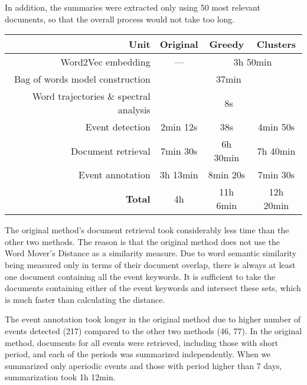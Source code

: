 In addition, the summaries were extracted only using 50 most relevant documents, so that the overall process would not take too long.

\hspace{\fill}

\begin{minipage}{\linewidth}
\centering
\begin{tabular}{ r c c c }\toprule[1.5pt]
\bf Unit & \bf Original & \bf Greedy & \bf Clusters \\ \midrule
Word2Vec embedding & --- & \multicolumn{2}{c}{3h 50min} \\
Bag of words model construction & \multicolumn{3}{c}{37min} \\
Word trajectories \& spectral analysis & \multicolumn{3}{c}{8s} \\
Event detection & 2min 12s & 38s & 4min 50s \\
Document retrieval & 7min 30s & 6h 30min & 7h 40min \\
Event annotation & 3h 13min & 8min 20s & 7min 30s \\ \midrule
\bf Total & 4h & 11h 6min & 12h 20min\\ \bottomrule[1.25pt]

\end{tabular}\par
{} \label{tab:title}
\end{minipage}

\hspace{\fill}

The original method's document retrieval took considerably less time than the other two methods. The reason is that the original method does not use the Word Mover's Distance as a similarity measure. Due to word semantic similarity being measured only in terms of their document overlap, there is always at least one document containing all the event keywords. It is sufficient to take the documents containing either of the event keywords and intersect these sets, which is much faster than calculating the distance.

The event annotation took longer in the original method due to higher number of events detected (217) compared to the other two methods (46, 77). In the original method, documents for all events were retrieved, including those with short period, and each of the periods was summarized independently. When we summarized only aperiodic events and those with period higher than 7 days, summarization took 1h 12min.

